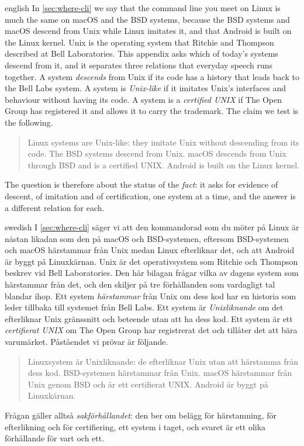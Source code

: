 
\begin{onlyin}{english} %
In \cref{sec:where-cli} we say that the command line you meet on Linux
is much the same on macOS and the BSD systems, because the BSD systems
and
macOS descend from Unix while Linux imitates it, and that Android is
built on the Linux kernel.
Unix is the operating system that Ritchie and Thompson described at Bell
Laboratories\autocite{RitchieThompson1974}.
This appendix asks which of today's systems descend from it, and it
separates three relations that everyday speech runs together.
A system \emph{descends} from Unix if its code has a history that leads
back to the Bell Labs system.
A system is \emph{Unix-like} if it imitates Unix's interfaces and
behaviour without having its code.
A system is a \emph{certified UNIX} if The Open Group has registered it
and allows it to carry the trademark.
The claim we test is the following.
\begin{quote}
  Linux systems are Unix-like: they imitate Unix without descending
  from its code.
  The BSD systems descend from Unix.
  macOS descends from Unix through BSD and is a certified UNIX.
  Android is built on the Linux kernel.
\end{quote}
The question is therefore about the status of the \emph{fact}: it asks
for evidence of descent, of imitation and of certification, one system
at a time, and the answer is a different relation for each.
\end{onlyin}
\begin{onlyin}{swedish}
I \cref{sec:where-cli} säger vi att den kommandorad som du möter på
Linux är nästan likadan som den på macOS och BSD-systemen, eftersom
BSD-systemen
och macOS härstammar från Unix medan Linux efterliknar det, och att
Android är byggt på Linuxkärnan.
Unix är det operativsystem som Ritchie och Thompson beskrev vid Bell
Laboratories\autocite{RitchieThompson1974}.
Den här bilagan frågar vilka av dagens system som härstammar från det,
och den skiljer på tre förhållanden som vardagligt tal blandar ihop.
Ett system \emph{härstammar} från Unix om dess kod har en historia som
leder tillbaka till systemet från Bell Labs.
Ett system är \emph{Unixliknande} om det efterliknar Unix gränssnitt och
beteende utan att ha dess kod.
Ett system är ett \emph{certifierat UNIX} om The Open Group har
registrerat det och tillåter det att bära varumärket.
Påståendet vi prövar är följande.
\begin{quote}
  Linuxsystem är Unixliknande: de efterliknar Unix utan att härstamma
  från dess kod.
  BSD-systemen härstammar från Unix.
  macOS härstammar från Unix genom BSD och är ett certifierat UNIX.
  Android är byggt på Linuxkärnan.
\end{quote}
Frågan gäller alltså \emph{sakförhållandet}: den ber om belägg för
härstamning, för efterlikning och för certifiering, ett system i taget,
och svaret är ett olika förhållande för vart och ett.
\end{onlyin}

